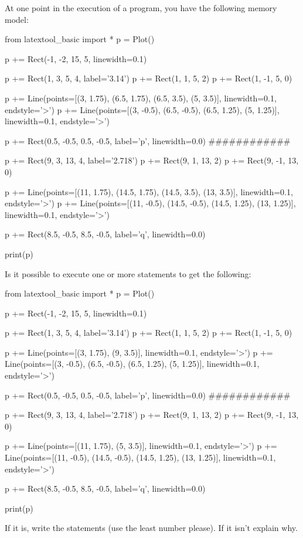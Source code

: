 \begin{ex}
At one point in the execution of a program, you have the following memory model:
\begin{python}
from latextool_basic import *
p = Plot()

p += Rect(-1, -2, 15, 5, linewidth=0.1)

p += Rect(1, 3, 5, 4, label='3.14')
p += Rect(1, 1, 5, 2)
p += Rect(1, -1, 5, 0)

p += Line(points=[(3, 1.75), (6.5, 1.75), (6.5, 3.5), (5, 3.5)],
          linewidth=0.1, endstyle='>')
p += Line(points=[(3, -0.5), (6.5, -0.5), (6.5, 1.25), (5, 1.25)],
          linewidth=0.1, endstyle='>')

p += Rect(0.5, -0.5, 0.5, -0.5, label='p', linewidth=0.0)
############

p += Rect(9, 3, 13, 4, label='2.718')
p += Rect(9, 1, 13, 2)
p += Rect(9, -1, 13, 0)

p += Line(points=[(11, 1.75), (14.5, 1.75), (14.5, 3.5), (13, 3.5)],
          linewidth=0.1, endstyle='>')
p += Line(points=[(11, -0.5), (14.5, -0.5), (14.5, 1.25), (13, 1.25)],
          linewidth=0.1, endstyle='>')

p += Rect(8.5, -0.5, 8.5, -0.5, label='q', linewidth=0.0)

print(p)
\end{python}

Is it possible to execute one or more statements to get the following:
\begin{python}
from latextool_basic import *
p = Plot()

p += Rect(-1, -2, 15, 5, linewidth=0.1)

p += Rect(1, 3, 5, 4, label='3.14')
p += Rect(1, 1, 5, 2)
p += Rect(1, -1, 5, 0)

p += Line(points=[(3, 1.75), (9, 3.5)],
          linewidth=0.1, endstyle='>')
p += Line(points=[(3, -0.5), (6.5, -0.5), (6.5, 1.25), (5, 1.25)],
          linewidth=0.1, endstyle='>')

p += Rect(0.5, -0.5, 0.5, -0.5, label='p', linewidth=0.0)
############

p += Rect(9, 3, 13, 4, label='2.718')
p += Rect(9, 1, 13, 2)
p += Rect(9, -1, 13, 0)

p += Line(points=[(11, 1.75),  (5, 3.5)],
          linewidth=0.1, endstyle='>')
p += Line(points=[(11, -0.5), (14.5, -0.5), (14.5, 1.25), (13, 1.25)],
          linewidth=0.1, endstyle='>')

p += Rect(8.5, -0.5, 8.5, -0.5, label='q', linewidth=0.0)

print(p)
\end{python}

If it is, write the statements (use the least number please). If it isn't explain why.
\end{ex}

